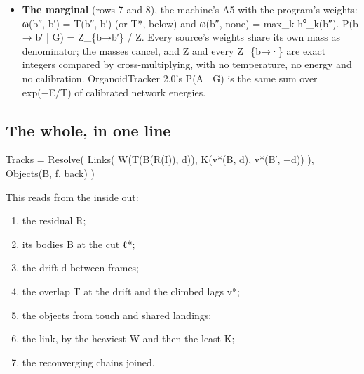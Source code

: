 \begin{itemize}
\begin{itemize}
\item pass 1: N = σ ∘ (S\_\allowbreak{}A m\_\allowbreak{}B − S\_\allowbreak{}B m\_\allowbreak{}A) per pair, where σ\_\allowbreak{}a = voxel\_\allowbreak{}pm\_\allowbreak{}a / gcd(voxel\_\allowbreak{}pm);
\item pass 2 reads two pass-1 records: dot = N · N′, c = COMPARE(dot + 1, 1) = sign(dot);
\item kept = c (c + 1) and crossed = c (c − 1).
\end{itemize}

dot is (c\_\allowbreak{}A − c\_\allowbreak{}B)·(c\_\allowbreak{}A′ − c\_\allowbreak{}B′) in physical space times the positive m\_\allowbreak{}A m\_\allowbreak{}B m\_\allowbreak{}A′ m\_\allowbreak{}B′ / gcd²; its sign is exact. Two membranes cannot pass through one another; a real pair keeps its side. dot = 0 includes A′ = B′, the pair landing on one body.
\item \textbf{The marginal} (rows 7 and 8), the machine's A5 with the program's weights: ω(b″, b′) = T(b″, b′) (or T*, below) and ω(b″, none) = max\_\allowbreak{}k h⁰\_\allowbreak{}k(b″). P(b → b′ | G) = Z\_\allowbreak{}\{b→b′\} / Z. Every source's weights share its own mass as denominator; the masses cancel, and Z and every Z\_\allowbreak{}\{b→·\} are exact integers compared by cross-multiplying, with no temperature, no energy and no calibration. OrganoidTracker 2.0's P(A | G) is the same sum over exp(−E/T) of calibrated network energies.
\end{itemize}

\subsection{\texorpdfstring{The whole, in one line}{The whole, in one line}}

Tracks = Resolve( Links( W(T(B(R(I)), d)), K(v*(B, d), v*(B′, −d)) ), Objects(B, f, back) )

This reads from the inside out:

\begin{enumerate}
\item the residual R;
\item its bodies B at the cut ℓ*;
\item the drift d between frames;
\item the overlap T at the drift and the climbed lags v*;
\item the objects from touch and shared landings;
\item the link, by the heaviest W and then the least K;
\item the reconverging chains joined.
\end{enumerate}


